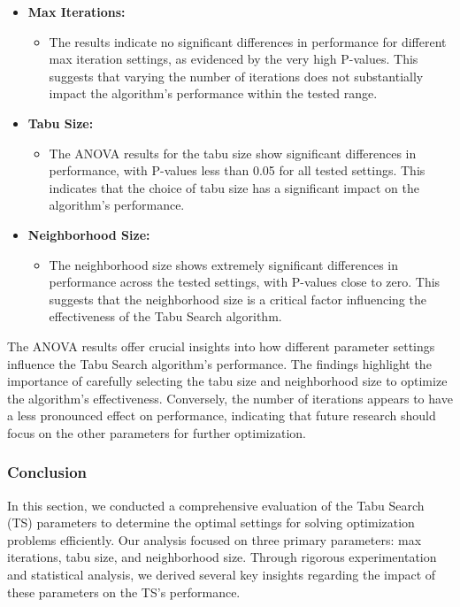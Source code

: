 \documentclass[
]{article}
\begin{document}
    \begin{itemize}
        \item \textbf{Max Iterations:}
        \begin{itemize}
            \item The results indicate no significant differences in performance for different max iteration settings, as evidenced by the very high P-values. This suggests that varying the number of iterations does not substantially impact the algorithm's performance within the tested range.
        \end{itemize}
        \item \textbf{Tabu Size:}
        \begin{itemize}
            \item The ANOVA results for the tabu size show significant differences in performance, with P-values less than 0.05 for all tested settings. This indicates that the choice of tabu size has a significant impact on the algorithm's performance.
        \end{itemize}
        \item \textbf{Neighborhood Size:}
        \begin{itemize}
            \item The neighborhood size shows extremely significant differences in performance across the tested settings, with P-values close to zero. This suggests that the neighborhood size is a critical factor influencing the effectiveness of the Tabu Search algorithm.
        \end{itemize}
    \end{itemize}

    The ANOVA results offer crucial insights into how different parameter settings influence the Tabu Search algorithm's performance. The findings highlight the importance of carefully selecting the tabu size and neighborhood size to optimize the algorithm's effectiveness. Conversely, the number of iterations appears to have a less pronounced effect on performance, indicating that future research should focus on the other parameters for further optimization.

    \subsubsection{Conclusion}

    In this section, we conducted a comprehensive evaluation of the Tabu Search (TS) parameters to determine the optimal settings for solving optimization problems efficiently. Our analysis focused on three primary parameters: max iterations, tabu size, and neighborhood size. Through rigorous experimentation and statistical analysis, we derived several key insights regarding the impact of these parameters on the TS’s performance.
\end{document}
